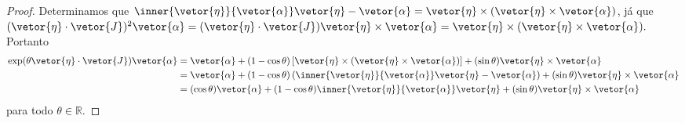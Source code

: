 \begin{proof}
    Determinamos que \(\inner{\vetor{\eta}}{\vetor{\alpha}}\vetor{\eta} - \vetor{\alpha} = \vetor{\eta}\times(\vetor{\eta} \times \vetor{\alpha})\), já que \((\vetor{\eta}\cdot\vetor{J})^2\vetor{\alpha} = (\vetor{\eta}\cdot\vetor{J})\vetor{\eta}\times\vetor{\alpha} = \vetor{\eta}\times(\vetor{\eta}\times \vetor{\alpha}).\) Portanto
    \begin{align*}
        \exp(\theta \vetor{\eta}\cdot \vetor{J}) \vetor{\alpha}
        &= \vetor{\alpha} + (1 - \cos\theta) \left[\vetor{\eta} \times (\vetor{\eta} \times \vetor{\alpha})\right] + (\sin\theta)\vetor{\eta}\times \vetor{\alpha}\\
        &= \vetor{\alpha} + (1 - \cos\theta) \left(\inner{\vetor{\eta}}{\vetor{\alpha}}\vetor{\eta} - \vetor{\alpha}\right) + (\sin\theta)\vetor{\eta}\times \vetor{\alpha} \\
                                                                &=(\cos\theta)\vetor{\alpha} + (1 - \cos\theta) \inner{\vetor{\eta}}{\vetor{\alpha}}\vetor{\eta} +(\sin\theta)\vetor{\eta}\times \vetor{\alpha}
    \end{align*}
    para todo \(\theta \in \mathbb{R}\).
\end{proof}
